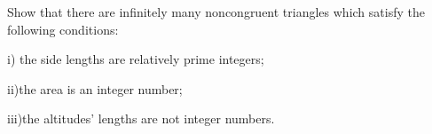 Show that there are infinitely many noncongruent triangles which satisfy the following conditions:

i) the side lengths are relatively prime integers;

ii)the area is an integer number;

iii)the altitudes' lengths are not integer numbers.
